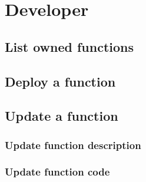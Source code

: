 \section{Developer}

\subsection{List owned functions}

\subsection{Deploy a function}

\subsection{Update a function}

\subsubsection{Update function description}

\subsubsection{Update function code}

